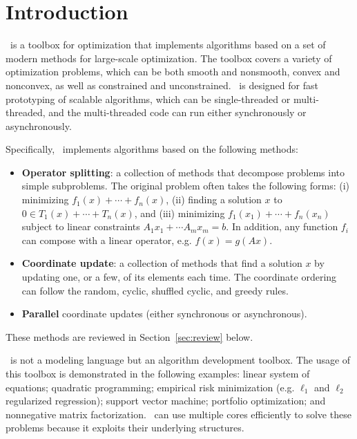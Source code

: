 \section{Introduction}
\pkg~is a toolbox for optimization that implements algorithms based on a set of modern methods for large-scale optimization. The toolbox covers a variety of optimization problems, which can  be both smooth and nonsmooth, convex and nonconvex, as well as constrained and unconstrained.  \pkg~is designed for fast prototyping of scalable algorithms, which can be  single-threaded or multi-threaded, and the multi-threaded code can run either synchronously or asynchronously.

Specifically, \pkg~implements  algorithms based on  the following methods:
\begin{itemize}
\item \textbf{Operator splitting}: a collection of methods that decompose problems into simple subproblems. The original problem often takes the following forms: (i) minimizing $f_1(x)+\cdots+f_n(x)$, (ii) finding a solution $x$ to $0\in T_1(x)+\cdots +T_n(x)$, and (iii) minimizing $f_1(x_1)+\cdots+f_n(x_n)$ subject to linear constraints $A_1 x_1+\cdots A_m x_m=b$. In addition, any function $f_i$ can compose with a linear operator, e.g. $f(x) = g(Ax)$.

\item \textbf{Coordinate update}: a collection of methods that find a solution $x$ by updating one, or a few, of its elements each time. The coordinate ordering can follow the random, cyclic, shuffled cyclic, and greedy rules.

\item \textbf{Parallel} %
coordinate updates (either synchronous or asynchronous).
\end{itemize}
These methods are reviewed in Section~\ref{sec:review} below.

\pkg~is not a modeling language but an algorithm development toolbox. %
The usage of this toolbox is demonstrated in the following examples:
 linear system of equations;
quadratic programming;
empirical risk minimization (e.g. $\ell_1$ and $\ell_2$ regularized  regression);
support vector machine;
portfolio optimization;
and nonnegative matrix factorization. \pkg~can use multiple cores efficiently to solve these  problems because it exploits their underlying structures. %

